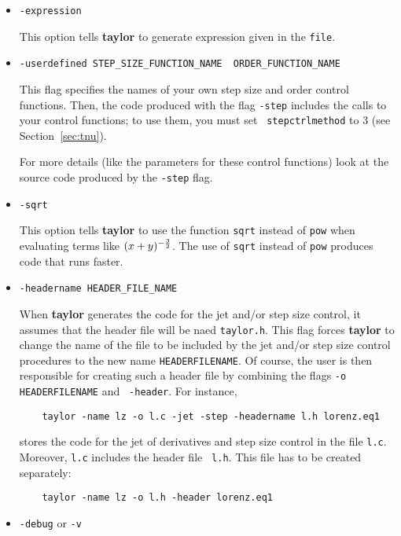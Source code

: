 \documentclass[10pt]{article}
\theoremstyle{remark}
\newcommand{\taylorname}{{\bf taylor}}
\newcommand{\myfloat}{{\tt MY\symbol{95}FLOAT}}
\newcommand{\myjet}{{\tt MY\symbol{95}JET}}
\newcommand{\mycoef}{{\tt MY\symbol{95}COEF}}
\begin{document}
\begin{itemize}
{{This option select a library for the coefficients of \myjet{} library,
i.e. \mycoef{}. By default, \taylorname{} uses the \myfloat{}
arithmetic. This option allows you to overwrite that with a special
purpose library. Possible values for \verb+COEFLIBRARY+ are:
\begin{itemize}
    \item \verb+my_float+ uses \myfloat{}. This is the default.
    \item \verb+jet_tree <nsymb> <deg>+ uses \verb+jet_tree+ for
      \mycoef{}. It uses the maximum number of symbols \verb+nsymb+
      and the maximum degree \verb+deg+. Otherwise it uses the ones
      considered in \myjet{}.
\end{itemize}
}
}
\item {
{\verb+-expression+

This option tells \taylorname{} to generate expression given in the
\verb+file+.}  }
\item{
{\verb+-userdefined STEP_SIZE_FUNCTION_NAME  ORDER_FUNCTION_NAME+

This flag specifies the names of your own step size and order control
functions. Then, the code produced with the flag {\tt -step} includes
the calls to your control functions; to use them, you must set {\tt
  stepctrlmethod} to 3 (see
Section~\ref{sec:tnu}).

For more details (like the parameters for these control functions)
look at the source code produced by the {\tt -step} flag.  }
}
\item {
{\verb+-sqrt+

This option tells \taylorname{} to use the function \verb+sqrt+
instead of \verb+pow+ when evaluating terms like $(x+y)^{-{3\over
    2}}$.  The use of {\tt sqrt} instead of {\tt pow} produces code
that runs faster.}
}
\item {
{\verb+-headername HEADER_FILE_NAME+

When \taylorname{} generates the code for the jet and/or step size
control, it assumes that the header file will be naed {\tt taylor.h}.
This flag forces \taylorname{} to change the name of the file to be
included by the jet and/or step size control procedures to the new
name {\tt HEADERFILENAME}. Of course, the user
is then responsible for creating such a header file by combining the
flags {\tt -o HEADERFILENAME} and {\tt
  -header}. For instance,
\begin{verbatim}
    taylor -name lz -o l.c -jet -step -headername l.h lorenz.eq1
\end{verbatim}
stores the code for the jet of derivatives and step size control in
the file {\tt l.c}. Moreover, {\tt l.c} includes the header file {\tt
  l.h}. This file has to be created separately:
\begin{verbatim}
    taylor -name lz -o l.h -header lorenz.eq1
\end{verbatim}
}
}
\item {
{\verb+-debug+ or \verb+-v+ 

}}
\end{itemize}
\end{document}

